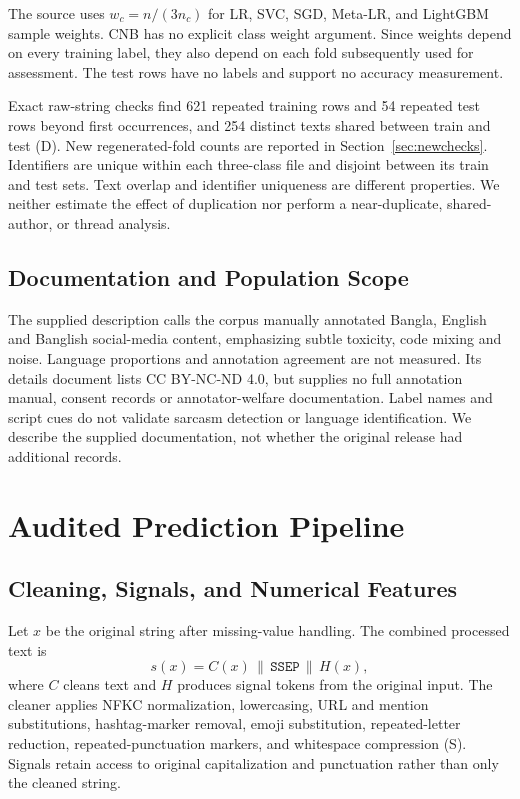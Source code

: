 \documentclass[doublecolumn]{ijcvsplatex}
\begin{document}
The source uses $w_c=n/(3n_c)$ for LR, SVC, SGD, Meta-LR, and LightGBM sample weights. CNB has no explicit class weight argument. Since weights depend on every training label, they also depend on each fold subsequently used for assessment. The test rows have no labels and support no accuracy measurement.

Exact raw-string checks find 621 repeated training rows and 54 repeated test rows beyond first occurrences, and 254 distinct texts shared between train and test (D). New regenerated-fold counts are reported in Section~\ref{sec:newchecks}. Identifiers are unique within each three-class file and disjoint between its train and test sets. Text overlap and identifier uniqueness are different properties. We neither estimate the effect of duplication nor perform a near-duplicate, shared-author, or thread analysis.

\subsection{Documentation and Population Scope}
The supplied description calls the corpus manually annotated Bangla, English and Banglish social-media content, emphasizing subtle toxicity, code mixing and noise. Language proportions and annotation agreement are not measured. Its details document lists CC BY-NC-ND 4.0, but supplies no full annotation manual, consent records or annotator-welfare documentation. Label names and script cues do not validate sarcasm detection or language identification. We describe the supplied documentation, not whether the original release had additional records.

\section{Audited Prediction Pipeline}
\label{sec:pipeline}

\subsection{Cleaning, Signals, and Numerical Features}
Let $x$ be the original string after missing-value handling. The combined processed text is
\begin{equation}
s(x)=C(x)\,\|\,\texttt{SSEP}\,\|\,H(x),
\end{equation}
where $C$ cleans text and $H$ produces signal tokens from the original input. The cleaner applies NFKC normalization, lowercasing, URL and mention substitutions, hashtag-marker removal, emoji substitution, repeated-letter reduction, repeated-punctuation markers, and whitespace compression (S). Signals retain access to original capitalization and punctuation rather than only the cleaned string.
\end{document}
